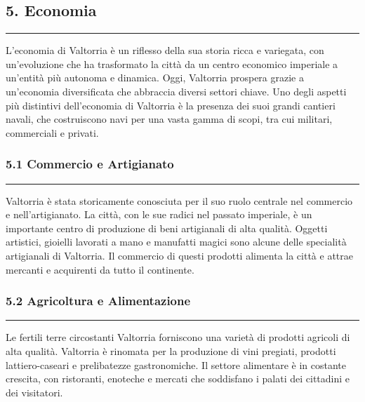 \subsection{5. Economia}\label{economia}

\begin{center}\rule{0.5\linewidth}{0.5pt}\end{center}

L'economia di Valtorria è un riflesso della sua storia ricca e
variegata, con un'evoluzione che ha trasformato la città da un centro
economico imperiale a un'entità più autonoma e dinamica. Oggi, Valtorria
prospera grazie a un'economia diversificata che abbraccia diversi
settori chiave. Uno degli aspetti più distintivi dell'economia di
Valtorria è la presenza dei suoi grandi cantieri navali, che
costruiscono navi per una vasta gamma di scopi, tra cui militari,
commerciali e privati.

\subsubsection{\texorpdfstring{5.1 \textbf{Commercio e
Artigianato}}{5.1 Commercio e Artigianato}}\label{commercio-e-artigianato}

\begin{center}\rule{0.5\linewidth}{0.5pt}\end{center}

Valtorria è stata storicamente conosciuta per il suo ruolo centrale nel
commercio e nell'artigianato. La città, con le sue radici nel passato
imperiale, è un importante centro di produzione di beni artigianali di
alta qualità. Oggetti artistici, gioielli lavorati a mano e manufatti
magici sono alcune delle specialità artigianali di Valtorria. Il
commercio di questi prodotti alimenta la città e attrae mercanti e
acquirenti da tutto il continente.

\subsubsection{\texorpdfstring{5.2 \textbf{Agricoltura e
Alimentazione}}{5.2 Agricoltura e Alimentazione}}\label{agricoltura-e-alimentazione}

\begin{center}\rule{0.5\linewidth}{0.5pt}\end{center}

Le fertili terre circostanti Valtorria forniscono una varietà di
prodotti agricoli di alta qualità. Valtorria è rinomata per la
produzione di vini pregiati, prodotti lattiero-caseari e prelibatezze
gastronomiche. Il settore alimentare è in costante crescita, con
ristoranti, enoteche e mercati che soddisfano i palati dei cittadini e
dei visitatori.

